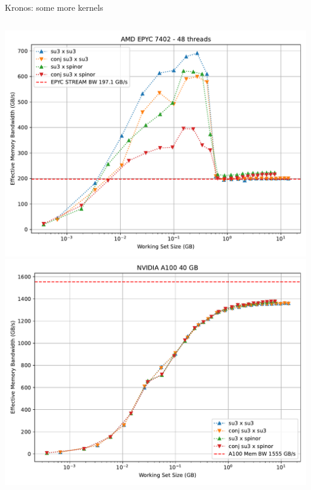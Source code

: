 \begin{frame}{Kronos: some more kernels}

  \begin{columns}
      \includegraphics[width=\textwidth]{figs/sun_spinor_benchmark_epyc.pdf}
      \includegraphics[width=\textwidth]{figs/sun_spinor_benchmark_a100.pdf}
  \end{columns}

\end{frame}

